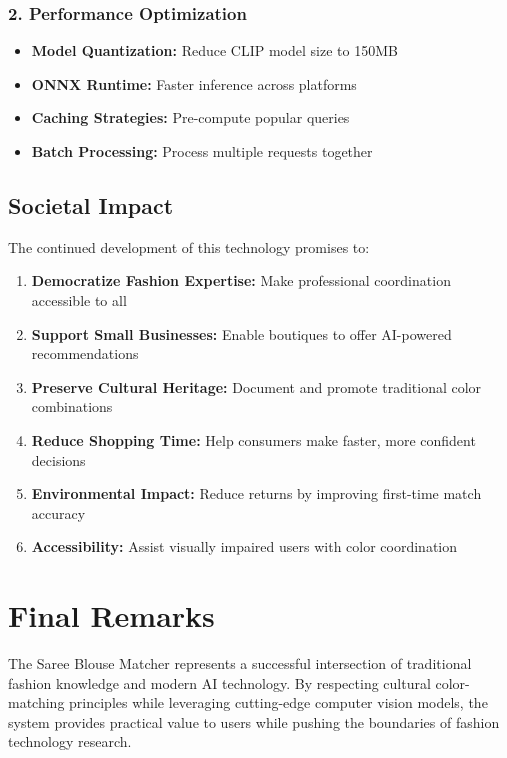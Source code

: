 \documentclass[12pt,a4paper]{report}
\begin{document}
\subsubsection{2. Performance Optimization}
\begin{itemize}
    \item \textbf{Model Quantization:} Reduce CLIP model size to 150MB
    \item \textbf{ONNX Runtime:} Faster inference across platforms
    \item \textbf{Caching Strategies:} Pre-compute popular queries
    \item \textbf{Batch Processing:} Process multiple requests together
\end{itemize}

\subsection{Societal Impact}

The continued development of this technology promises to:

\begin{enumerate}
    \item \textbf{Democratize Fashion Expertise:} Make professional coordination accessible to all
    \item \textbf{Support Small Businesses:} Enable boutiques to offer AI-powered recommendations
    \item \textbf{Preserve Cultural Heritage:} Document and promote traditional color combinations
    \item \textbf{Reduce Shopping Time:} Help consumers make faster, more confident decisions
    \item \textbf{Environmental Impact:} Reduce returns by improving first-time match accuracy
    \item \textbf{Accessibility:} Assist visually impaired users with color coordination
\end{enumerate}

\section{Final Remarks}

The Saree Blouse Matcher represents a successful intersection of traditional fashion knowledge and modern AI technology. By respecting cultural color-matching principles while leveraging cutting-edge computer vision models, the system provides practical value to users while pushing the boundaries of fashion technology research.
\end{document}
